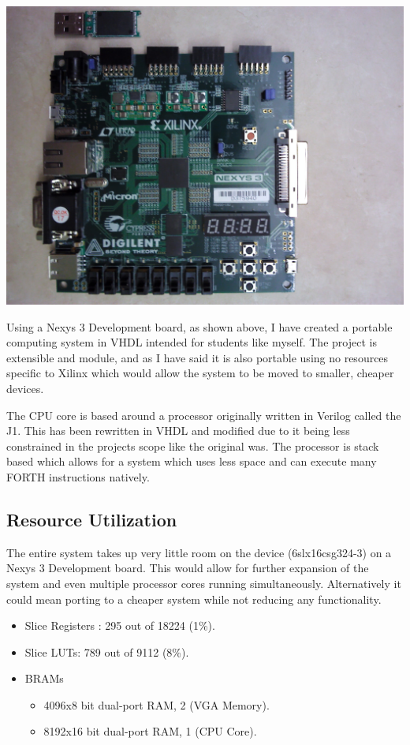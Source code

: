 \documentclass[a1paper,portrait]{baposter}
\begin{document}
\begin{poster}
{\begin{center}
    \includegraphics[scale=0.1]{devBoard.jpg}
\end{center}

Using a Nexys 3 Development board, as shown above, I have created a
portable computing system in VHDL intended for students like myself. The
project is extensible and module, and as I have said it is also portable
using no resources specific to Xilinx which would allow the system to
be moved to smaller, cheaper devices.

The CPU core is based around a processor originally written in Verilog
called the J1\cite{j1core}. This has been rewritten in VHDL and modified
due to it being less constrained in the projects scope like the original
was. The processor is stack based which allows for a system which uses
less space and can execute many FORTH instructions natively.

\subsection{Resource Utilization}
The entire system takes up very little room on the device (6slx16csg324-3)
on a Nexys 3 Development board. This would allow for further expansion of
the system and even multiple processor cores running simultaneously. Alternatively
it could mean porting to a cheaper system while not reducing any functionality.
\begin{center}
    \begin{itemize}
        \item Slice Registers : 295 out of 18224 (1\%).
        \item Slice LUTs: 789 out of 9112 (8\%).
        \item BRAMs 
            \begin{itemize}
                \item 4096x8 bit dual-port RAM, 2 (VGA Memory).
                \item 8192x16 bit dual-port RAM, 1 (CPU Core).
            \end{itemize}
    \end{itemize}
\end{center}

}
\end{poster}
\end{document}
